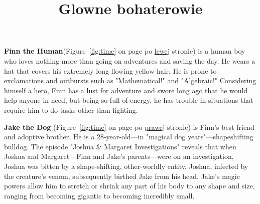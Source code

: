 \begin{flushleft}
\begin{center}     
\title{ \huge Glowne bohaterowie}
\end{center}
\setlength{\parindent}{1em}  
\par  
\textbf{Finn the Human}(Figure~\ref{fig:time} on page \pageref{fig:time} po \underline{lewej} stronie) is a human boy who loves nothing more than going on adventures and saving the day. He wears a hat that covers his extremely long flowing yellow hair. He is prone to exclamations and outbursts such as "Mathematical!" and "Algebraic!" Considering himself a hero, Finn has a lust for adventure and swore long ago that he would help anyone in need, but being so full of energy, he has trouble in situations that require him to do tasks other than fighting.
\par
\textbf{Jake the Dog} (Figure~\ref{fig:time} on page \pageref{fig:time} po \underline{prawej} stronie) is Finn's best friend and adoptive brother. He is a 28-year-old—in "magical dog years"—shapeshifting bulldog. The episode "Joshua \& Margaret Investigations" reveals that when Joshua and Margaret—Finn and Jake's parents—were on an investigation, Joshua was bitten by a shape-shifting, other-worldly entity. Joshua, infected by the creature's venom, subsequently birthed Jake from his head. Jake's magic powers allow him to stretch or shrink any part of his body to any shape and size, ranging from becoming gigantic to becoming incredibly small.
\end{flushleft}